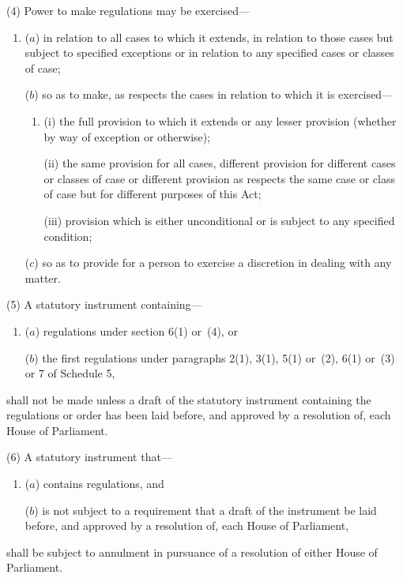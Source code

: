 \documentclass[12pt,a4paper]{article}
\begin{document}
(4) Power to make regulations may be exercised---
\begin{enumerate}\item[]
($a$) in relation to all cases to which it extends, in relation to those cases but subject to specified exceptions or in relation to any specified cases or classes of case;

($b$) so as to make, as respects the cases in relation to which it is exercised---
\begin{enumerate}\item[]
(i) the full provision to which it extends or any lesser provision (whether by way of exception or otherwise);

(ii) the same provision for all cases, different provision for different cases or classes of case or different provision as respects the same case or class of case but for different purposes of this Act;

(iii) provision which is either unconditional or is subject to any specified condition;
\end{enumerate}

($c$) so as to provide for a person to exercise a discretion in dealing with any matter.
\end{enumerate}

(5) A statutory instrument containing---
\begin{enumerate}\item[]
($a$) regulations under section 6(1) or~(4), or

($b$) the first regulations under paragraphs 2(1), 3(1), 5(1) or~(2), 6(1) or~(3) or 7 of Schedule 5,%
%
\end{enumerate}
shall not be made unless a draft of the statutory instrument containing the regulations or order has been laid before, and approved by a resolution of, each House of Parliament.

(6) A statutory instrument that---
\begin{enumerate}\item[]
($a$) contains regulations, and

($b$) is not subject to a requirement that a draft of the instrument be laid before, and approved by a resolution of, each House of Parliament,
\end{enumerate}
shall be subject to annulment in pursuance of a resolution of either House of Parliament.

\end{document}
